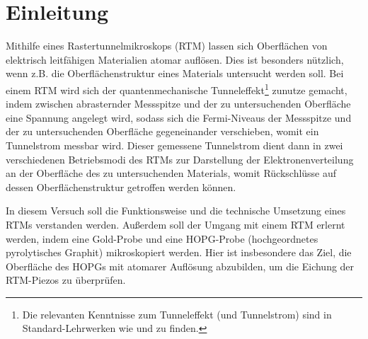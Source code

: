\section{Einleitung}\label{sec:einleitung}
Mithilfe eines Rastertunnelmikroskops (RTM) lassen sich Oberflächen von elektrisch leitfähigen Materialien atomar auflösen. Dies ist besonders
nützlich, wenn z.B. die Oberflächenstruktur eines Materials untersucht werden soll. Bei einem RTM wird sich der quantenmechanische
Tunneleffekt\footnote[1]{Die relevanten Kenntnisse zum Tunneleffekt (und Tunnelstrom) sind in Standard-Lehrwerken wie \cite{Demtröder:829119} und \cite{münster} zu finden.} 
zunutze gemacht, indem zwischen abrasternder Messspitze und der zu untersuchenden Oberfläche eine Spannung angelegt wird, sodass
sich die Fermi-Niveaus der Messspitze und der zu untersuchenden Oberfläche gegeneinander verschieben, womit ein Tunnelstrom messbar wird.
Dieser gemessene Tunnelstrom dient dann in zwei verschiedenen Betriebsmodi des RTMs zur Darstellung der Elektronenverteilung an der Oberfläche
des zu untersuchenden Materials, womit Rückschlüsse auf dessen Oberflächenstruktur getroffen werden können.\par
In diesem Versuch soll die Funktionsweise und die technische Umsetzung eines RTMs verstanden werden. Außerdem soll der Umgang mit einem RTM
erlernt werden, indem eine Gold-Probe und eine HOPG-Probe (hochgeordnetes pyrolytisches Graphit) mikroskopiert werden. Hier ist insbesondere das Ziel,
die Oberfläche des HOPGs mit atomarer Auflösung abzubilden, um die Eichung der RTM-Piezos zu überprüfen.